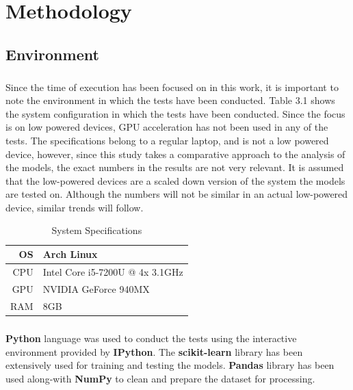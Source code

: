 \chapter{Methodology}
\label{ch:PD}

\section{Environment}

\paragraph{}
Since the time of execution has been focused on in this work, it is important to note the environment in which the tests have been conducted. Table 3.1 shows the system configuration in which the tests have been conducted. Since the focus is on low powered devices, GPU acceleration has not been used in any of the tests. The specifications belong to a regular laptop, and is not a low powered device, however, since this study takes a comparative approach to the analysis of the models, the exact numbers in the results are not very relevant. It is assumed that the low-powered devices are a scaled down version of the system the models are tested on. Although the numbers will not be similar in an actual low-powered device, similar trends will follow.
\begin{table}[h]
    \centering
    \caption{System Specifications}
    \begin{tabular}{| r | l |}
        \hline
        OS & Arch Linux \\
        \hline
        CPU & Intel Core i5-7200U @ 4x 3.1GHz \\
        \hline
        GPU & NVIDIA GeForce 940MX \\
        \hline
        RAM & 8GB \\
        \hline
    \end{tabular}
\end{table}

\paragraph{}
\textbf{Python} language was used to conduct the tests using the interactive environment provided by \textbf{IPython}. The \textbf{scikit-learn} library has been extensively used for training and testing the models. \textbf{Pandas} library has been used along-with \textbf{NumPy} to clean and prepare the dataset for processing.

